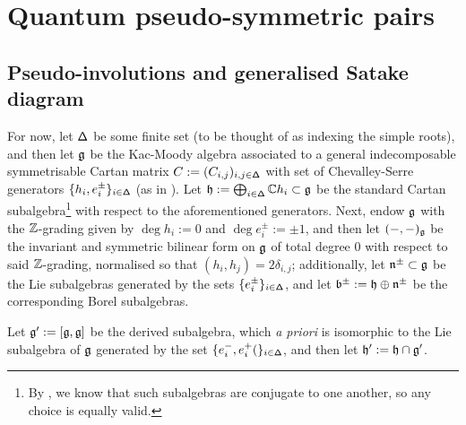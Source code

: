 \section{Quantum pseudo-symmetric pairs}
    \subsection{Pseudo-involutions and generalised Satake diagram}
        For now, let $\mathsf{\Delta}$ be some finite set (to be thought of as indexing the simple roots), and then let $\mathfrak{g}$ be the Kac-Moody algebra associated to a general indecomposable symmetrisable Cartan matrix $C := (C_{i, j})_{i, j \in \mathsf{\Delta}}$ with set of Chevalley-Serre generators $\{h_i, e_i^{\pm}\}_{i \in \mathsf{\Delta}}$ (as in \cite[Chapter 1]{kac_infinite_dimensional_lie_algebras}). Let $\mathfrak{h} := \bigoplus_{i \in \mathsf{\Delta}} \mathbb{C} h_i \subset \mathfrak{g}$ be the standard Cartan subalgebra\footnote{By \cite{kac_peterson_infinite_flag_varieties_and_conjugacy_of_cartan_subalgebras}, we know that such subalgebras are conjugate to one another, so any choice is equally valid.} with respect to the aforementioned generators. Next, endow $\mathfrak{g}$ with the $\mathbb{Z}$-grading given by $\deg h_i := 0$ and $\deg e_i^{\pm} := \pm 1$, and then let $(-, -)_{\mathfrak{g}}$ be the invariant and symmetric bilinear form on $\mathfrak{g}$ of total degree $0$ with respect to said $\mathbb{Z}$-grading, normalised so that $(h_i, h_j) = 2\delta_{i, j}$; additionally, let $\mathfrak{n}^{\pm} \subset \mathfrak{g}$ be the Lie subalgebras generated by the sets $\{e_i^{\pm}\}_{i \in \mathsf{\Delta}}$, and let $\mathfrak{b}^{\pm} := \mathfrak{h} \oplus \mathfrak{n}^{\pm}$ be the corresponding Borel subalgebras.
        
        Let $\mathfrak{g}' := [\mathfrak{g}, \mathfrak{g}]$ be the derived subalgebra, which \textit{a priori} is isomorphic to the Lie subalgebra of $\mathfrak{g}$ generated by the set $\{e_i^-, e_i^+(\}_{i \in \mathsf{\Delta}}$, and then let $\mathfrak{h}' := \mathfrak{h} \cap \mathfrak{g}'$. 

